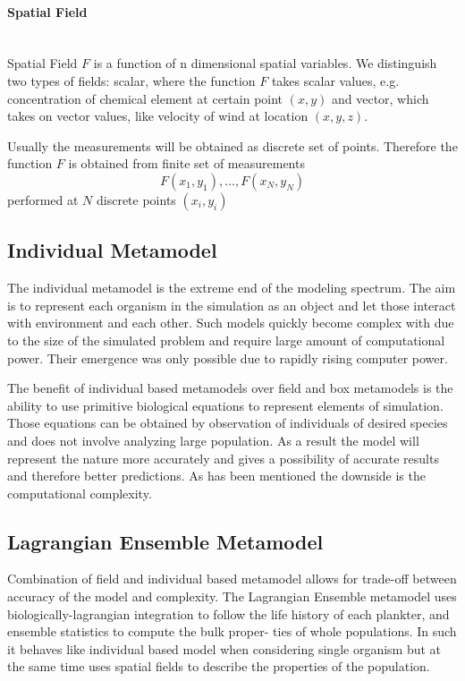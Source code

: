 \documentclass[12pt, a4paper]{report}
\newcommand{\myparagraph}[1]{\paragraph{#1}\mbox{}\\}
\begin{document}
\myparagraph{Spatial Field}\label{par:field}
Spatial Field $F$ is a function of n dimensional spatial variables.
We distinguish two types of fields: scalar, where the function $F$
takes scalar values, e.g. concentration of chemical element at certain
point $(x,y)$ and vector, which takes on vector values, like
velocity of wind at location $(x,y,z)$.

Usually the measurements will be obtained as discrete set of points.
Therefore the function $F$ is obtained from finite set of
measurements $$F(x_1,y_1),\ldots,F(x_N,y_N)$$ performed at $N$ discrete
points $(x_i,y_i)$

\subsection{Individual Metamodel}\label{subsec:agent-meta}
The individual metamodel is the extreme end of the modeling spectrum.
The aim is to represent each organism in the simulation as an object
and let those interact with environment and each other. Such models
quickly become complex with due to the size of the simulated problem
and require large amount of computational power. Their emergence
was only possible due to rapidly rising computer power.

The benefit of individual based metamodels over field and box metamodels
is the ability to use primitive biological equations to represent
elements of simulation. Those equations can be obtained by observation
of individuals of desired species and does not involve analyzing
large population. As a result the model will represent the nature
more accurately and gives a possibility of accurate results and
therefore better predictions. As has been mentioned the downside
is the computational complexity.

\subsection{Lagrangian Ensemble Metamodel}\label{subsec:le-meta}
Combination of field and individual based metamodel allows for trade-off
between accuracy of the model and complexity. The Lagrangian Ensemble
metamodel uses biologically-lagrangian integration to follow the life
history of each plankter, and ensemble statistics to compute the bulk proper-
ties of whole populations. In such it behaves like individual based model
when considering single organism but at the same time uses spatial fields
to describe the properties of the population.
\end{document}
